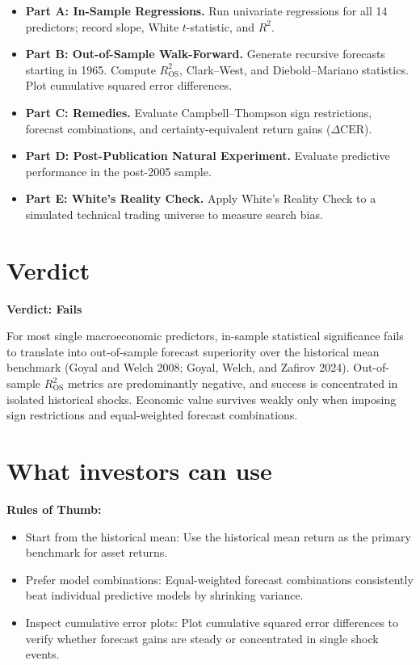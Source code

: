 \begin{itemize}
  \item \textbf{Part A: In-Sample Regressions.} Run univariate regressions for all 14 predictors; record slope, White $t$-statistic, and $R^2$.
  \item \textbf{Part B: Out-of-Sample Walk-Forward.} Generate recursive forecasts starting in 1965. Compute $R^2_{\text{OS}}$, Clark--West, and Diebold--Mariano statistics. Plot cumulative squared error differences.
  \item \textbf{Part C: Remedies.} Evaluate Campbell--Thompson sign restrictions, forecast combinations, and certainty-equivalent return gains ($\Delta \text{CER}$).
  \item \textbf{Part D: Post-Publication Natural Experiment.} Evaluate predictive performance in the post-2005 sample.
  \item \textbf{Part E: White's Reality Check.} Apply White's Reality Check to a simulated technical trading universe to measure search bias.
\end{itemize}

\section{Verdict}
\label{sec:08-verdict}

\begin{callout}
\noindent \textbf{Verdict: Fails}

For most single macroeconomic predictors, in-sample statistical significance fails to translate into out-of-sample forecast superiority over the historical mean benchmark (Goyal and Welch 2008; Goyal, Welch, and Zafirov 2024). Out-of-sample $R^2_{\text{OS}}$ metrics are predominantly negative, and success is concentrated in isolated historical shocks. Economic value survives weakly only when imposing sign restrictions and equal-weighted forecast combinations.
\end{callout}

\section{What investors can use}
\label{sec:08-investors}

\textbf{Rules of Thumb:}
\begin{itemize}
  \item Start from the historical mean: Use the historical mean return as the primary benchmark for asset returns.
  \item Prefer model combinations: Equal-weighted forecast combinations consistently beat individual predictive models by shrinking variance.
  \item Inspect cumulative error plots: Plot cumulative squared error differences to verify whether forecast gains are steady or concentrated in single shock events.
\end{itemize}

